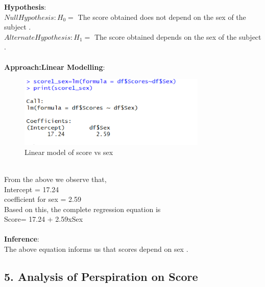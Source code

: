 \documentclass[12pt,epsf]{report}
\begin{document}
\textbf{Hypothesis}:\\
$Null Hypothesis : H_0 = $ The score obtained does not depend on the sex of the subject .\\
$Alternate Hypothesis : H_1 = $ The score obtained depends on the sex of the subject .\\
\\
\textbf{Approach:Linear Modelling}:\\
\begin{figure}[!ht]
	\centering
	\includegraphics[width=0.8\textwidth]{Picture4}
	\caption{Linear model of score vs sex}
	\centering
\end{figure}
\\
From the above we observe that,\\
Intercept = 17.24 \\
coefficient for sex = 2.59 \\
Based on this, the complete regression equation is \\
Score= 17.24 + 2.59xSex\\
\\
\textbf{Inference}:\\
The above equation informs us that scores depend on sex . \\

\subsection*{5. Analysis of Perspiration on Score}
\end{document}
